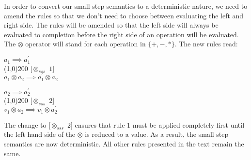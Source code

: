 



In order to convert our small step semantics to a deterministic nature, we need to amend the rules so that we don't need to choose between evaluating the left and right side. The rules will be amended so that the left side will always be evaluated to completion before the right side of an operation will be evaluated. The $\otimes$ operator will stand for each operation in $\{+,-,*\}$. The new rules read:

\begin{center}
    $a_1 \implies a_1^\prime$ \\
    \line(1,0){200} {}{}{}{}{}{}{} [$\otimes_{sss}$ $1$]\\
    $a_1 \otimes a_2 \implies a_1^\prime \otimes a_2$
\end{center}

\begin{center}
    $a_2 \implies a_2^\prime$ \\
    \line(1,0){200} {}{}{}{}{}{}{} [$\otimes_{sss}$ $2$]\\
    $v_1 \otimes a_2 \implies v_1 \otimes a_2^\prime$
\end{center}

The change to [$\otimes_{sss}$ $2$] ensures that rule 1 must be applied completely first until the left hand side of the $\otimes$ is reduced to a value. As a result, the small step semantics are now deterministic. All other rules presented in the text remain the same.

